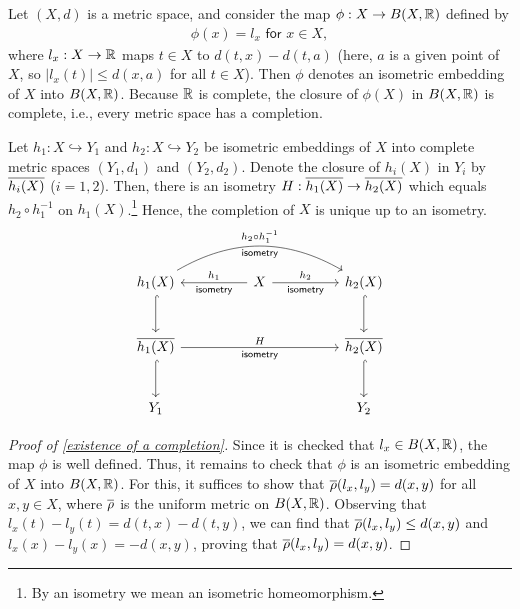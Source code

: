 \begin{thm}\label{existence of a completion}
    Let $(X, d)$ is a metric space, and consider the map $\phi: X\rightarrow B(X, {\mathbb{R}})$ defined by
    \begin{align*}
        \phi(x)=l_x\textsf{ for }x\in X,
    \end{align*}
    where $l_x: X\rightarrow{\mathbb{R}}$ maps $t\in X$ to $d(t, x)-d(t, a)$ (here, $a$ is a given point of $X$, so $|l_x(t)|\leq d(x, a)$ for all $t\in X$).
    Then $\phi$ denotes an isometric embedding of $X$ into $B(X, {\mathbb{R}})$.
    Because ${\mathbb{R}}$ is complete, the closure of $\phi(X)$ in $B(X, {\mathbb{R}})$ is complete, i.e., every metric space has a completion.
\end{thm}
\begin{thm}\label{uniqueness of a completion}
    Let $h_1: X\hookrightarrow Y_1$ and $h_2: X\hookrightarrow Y_2$ be isometric embeddings of $X$ into complete metric spaces $(Y_1, d_1)$ and $(Y_2, d_2)$.
    Denote the closure of $h_i(X)$ in $Y_i$ by $\overline{h_i(X)}$ ($i=1, 2$).
    Then, there is an isometry $H: \overline{h_1(X)}\rightarrow \overline{h_2(X)}$ which equals $h_2\circ h_1^{-1}$ on $h_1(X)$.\footnote{By an isometry we mean an isometric homeomorphism.}
    Hence, the completion of $X$ is unique up to an isometry.
    \begin{equation*}
    \begin{tikzcd}[row sep=large, column sep=huge]
        h_1(X)\arrow[d, hook]
        \arrow[rr, bend left, "h_2\circ h_1^{-1}", "\textsf{isometry}"']
        &
        X
        \arrow[l, "\textsf{isometry}", "h_1"']
        \arrow[r, "h_2", "\textsf{isometry}"']
        &
        h_2(X)\arrow[d, hook]
        \\
        \ol{h_1(X)}
        \arrow[d, hook]
        \arrow[rr, "H", "\textsf{isometry}"']
        &&
        \ol{h_2(X)}
        \arrow[d, hook]
        \\
        Y_1 && Y_2
    \end{tikzcd}
    \end{equation*}
\end{thm}
\begin{proof}[Proof of \cref{existence of a completion}]
    Since it is checked that $l_x\in B(X, {\mathbb{R}})$, the map $\phi$ is well defined.
    Thus, it remains to check that $\phi$ is an isometric embedding of $X$ into $B(X, {\mathbb{R}})$.
    For this, it suffices to show that $\overline{\rho}(l_x, l_y)=d(x, y)$ for all $x, y\in X$, where $\overline{\rho}$ is the uniform metric on $B(X, {\mathbb{R}})$.
    Observing that $l_x(t)-l_y(t)=d(t, x)-d(t, y)$, we can find that $\overline{\rho}(l_x, l_y)\leq d(x, y)$ and $l_x(x)-l_y(x)=-d(x, y)$, proving that $\overline{\rho}(l_x, l_y)=d(x, y)$.
\end{proof}
